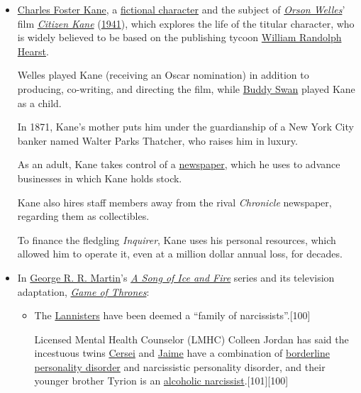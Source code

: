 \documentclass[oneside]{book}
\numberwithin{equation}{section}
\begin{document}
\begin{itemize}
    \item \href{https://en.wikipedia.org/wiki/Charles_Foster_Kane}{Charles Foster Kane}, a \href{https://en.wikipedia.org/wiki/Fictional_character}{fictional character} and the subject of \href{https://en.wikipedia.org/wiki/Orson_Welles}{\textit{Orson Welles}}' film \href{https://en.wikipedia.org/wiki/Citizen_Kane}{\textit{Citizen Kane}} (\href{https://en.wikipedia.org/wiki/1941_in_film}{1941}), which explores the life of the titular character, who is widely believed to be based on the publishing tycoon \href{https://en.wikipedia.org/wiki/William_Randolph_Hearst}{William Randolph Hearst}.
    
    Welles played Kane (receiving an Oscar nomination) in addition to producing, co-writing, and directing the film, while \href{https://en.wikipedia.org/wiki/Buddy_Swan}{Buddy Swan} played Kane as a child.
    
    In 1871, Kane's mother puts him under the guardianship of a New York City banker named Walter Parks Thatcher, who raises him in luxury.
    
    As an adult, Kane takes control of a \href{https://en.wikipedia.org/wiki/Newspaper}{newspaper}, which he uses to advance businesses in which Kane holds stock.
    
    Kane also hires staff members away from the rival \textit{Chronicle} newspaper, regarding them as collectibles.
    
    To finance the fledgling \textit{Inquirer}, Kane uses his personal resources, which allowed him to operate it, even at a million dollar annual loss, for decades.
    \item In \href{https://en.wikipedia.org/wiki/George_R._R._Martin}{George R. R. Martin}'s \href{https://en.wikipedia.org/wiki/A_Song_of_Ice_and_Fire}{\textit{A Song of Ice and Fire}} series and its television adaptation, \href{https://en.wikipedia.org/wiki/Game_of_Thrones}{\textit{Game of Thrones}}:
    \begin{itemize}
        \item The \href{https://en.wikipedia.org/wiki/Lannister}{Lannisters} have been deemed a ``family of narcissists''.[100]
        
        Licensed Mental Health Counselor (LMHC) Colleen Jordan has said the incestuous twins \href{https://en.wikipedia.org/wiki/Cersei_Lannister}{Cersei} and \href{https://en.wikipedia.org/wiki/Jaime_Lannister}{Jaime} have a combination of \href{https://en.wikipedia.org/wiki/Borderline_personality_disorder}{borderline personality disorder} and narcissistic personality disorder, and their younger brother Tyrion is an \href{https://en.wikipedia.org/wiki/Tyrion_Lannister}{alcoholic narcissist}.[101][100]
        

\end{itemize}
\end{itemize}
\end{document}

